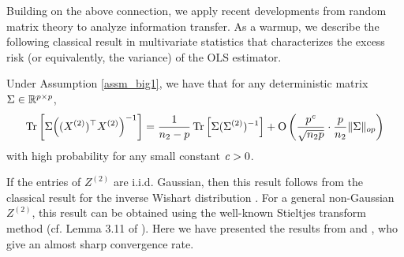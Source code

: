 Building on the above connection, we apply recent developments from random matrix theory to analyze information transfer.
As a warmup, we describe the following classical result in multivariate statistics that characterizes the excess risk (or equivalently, the variance) of the OLS estimator.

\begin{lemma}\label{fact_tr}
	Under Assumption \ref{assm_big1}, we have that for any deterministic  matrix $\Sigma\in\mathbb{R}^{p\times p}$,
		\[ \bigtr{\Sigma \Big((X^{(2)})^\top X^{(2)} \Big)^{-1}  } %
		= \frac{1}{n_2 - p}\bigtr{\Sigma (\Sigma^{(2)})^{-1}} +  \OO\left( \frac{p^{\e}}{\sqrt{n_2 p}}\cdot \frac{p}{n_2}\|\Sigma\|_{op} \right) \]
		with high probability for any small constant ${\mathit{c}}>0$.
\end{lemma}

If the entries of $Z^{(2)}$ are i.i.d. Gaussian, then this result follows from the classical result for %
the inverse Wishart distribution \cite{anderson1958introduction}. For a general non-Gaussian $Z^{(2)}$, this result can be obtained using the well-known Stieltjes transform method (cf. Lemma 3.11 of \citet{bai2009spectral}). Here we have presented the results from \citet{isotropic} and \citet{DY}, who give an almost sharp convergence rate.
